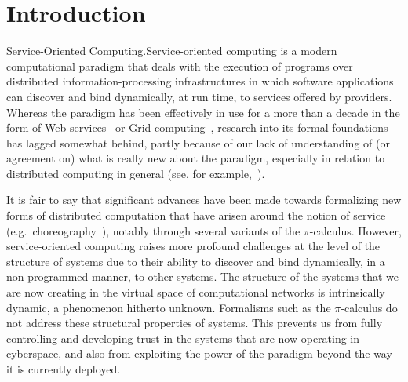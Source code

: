 \documentclass{LMCS}
\begin{document}
\section{Introduction}

\begin{minisection}{Service-Oriented Computing.}Service-oriented computing is a modern computational paradigm that deals with the execution of programs over distributed information-processing infrastructures in which software applications can discover and bind dynamically, at run time, to services offered by providers.
  Whereas the paradigm has been effectively in use for a more than a decade in the form of Web services~\cite{Alonso-Casati-Kuno-Machiraju:Web-Services-2004} or Grid computing~\cite{Foster-Kesselman:The-Grid-2-2004}, research into its formal foundations has lagged somewhat behind, partly because of our lack of understanding of (or agreement on) what is really new about the paradigm, especially in relation to distributed computing in general (see, for example,~\cite{Vogels:Web-services-are-not-distributed-objects-2003}).

  It is fair to say that significant advances have been made towards formalizing new forms of distributed computation that have arisen around the notion of service (e.g.\ choreography~\cite{Su-Bultan-Fu-Zhao:Web-service-choreographies-2007}), notably through several variants of the \(\pi\)\nb-calculus.  However, service-oriented computing raises more profound challenges at the level of the structure of  systems due to their ability to discover and bind dynamically, in a non-programmed manner, to other systems.  The structure of the systems that we are now creating in the virtual space of computational networks is intrinsically dynamic, a phenomenon hitherto unknown. Formalisms such as  the \(\pi\)\nb-calculus do not address these structural properties of systems.
  This prevents us from fully controlling and developing trust in the systems that are now operating in cyberspace, and also from exploiting the power of the paradigm beyond the way it is currently deployed.


\end{minisection}
\end{document}
